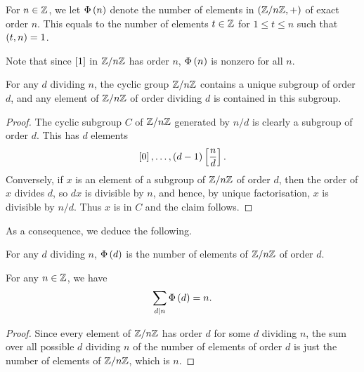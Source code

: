 \begin{definition}
For $ n \in \Z $, we let $ \Phi\rb{n} $ denote the number of elements in $ \rb{\Z / n\Z, +} $ of exact order $ n $. This equals to the number of elements $ t \in \Z $ for $ 1 \le t \le n $ such that $ \rb{t, n} = 1 $.
\end{definition}

Note that since $ \sb{1} $ in $ \Z / n\Z $ has order $ n $, $ \Phi\rb{n} $ is nonzero for all $ n $.

\begin{lemma}
For any $ d $ dividing $ n $, the cyclic group $ \Z / n\Z $ contains a unique subgroup of order $ d $, and any element of $ \Z / n\Z $ of order dividing $ d $ is contained in this subgroup.
\end{lemma}

\begin{proof}
The cyclic subgroup $ C $ of $ \Z / n\Z $ generated by $ n / d $ is clearly a subgroup of order $ d $. This has $ d $ elements
$$ \sb{0}, \dots, \rb{d - 1}\sb{\dfrac{n}{d}}. $$
Conversely, if $ x $ is an element of a subgroup of $ \Z / n\Z $ of order $ d $, then the order of $ x $ divides $ d $, so $ dx $ is divisible by $ n $, and hence, by unique factorisation, $ x $ is divisible by $ n / d $. Thus $ x $ is in $ C $ and the claim follows.
\end{proof}

As a consequence, we deduce the following.

\begin{corollary}
For any $ d $ dividing $ n $, $ \Phi\rb{d} $ is the number of elements of $ \Z / n\Z $ of order $ d $.
\end{corollary}

\begin{corollary}
\label{cor:6.4.5}
For any $ n \in \Z $, we have
$$ \sum_{d \mid n} \Phi\rb{d} = n. $$
\end{corollary}

\begin{proof}
Since every element of $ \Z / n\Z $ has order $ d $ for some $ d $ dividing $ n $, the sum over all possible $ d $ dividing $ n $ of the number of elements of order $ d $ is just the number of elements of $ \Z / n\Z $, which is $ n $.
\end{proof}

